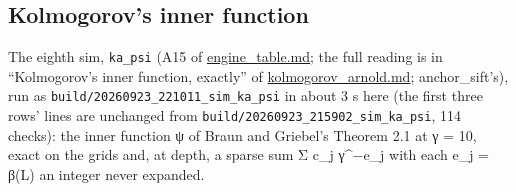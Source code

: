 \subsection{\texorpdfstring{Kolmogorov's inner function}{Kolmogorov's inner function}}

The eighth sim, \texttt{ka\_\allowbreak{}psi} (A15 of \hyperref[chap:engine-table]{engine\_\allowbreak{}table.md}; the full reading is in “Kolmogorov's inner function, exactly” of \hyperref[chap:kolmogorov-arnold]{kolmogorov\_\allowbreak{}arnold.md}; anchor\_\allowbreak{}sift's), run as \texttt{build/\allowbreak{}20260923\_\allowbreak{}221011\_\allowbreak{}sim\_\allowbreak{}ka\_\allowbreak{}psi} in about 3 s here (the first three rows' lines are unchanged from \texttt{build/\allowbreak{}20260923\_\allowbreak{}215902\_\allowbreak{}sim\_\allowbreak{}ka\_\allowbreak{}psi}, 114 checks): the inner function ψ of Braun and Griebel's Theorem 2.1 at γ = 10, exact on the grids and, at depth, a sparse sum Σ c\_\allowbreak{}j γ\textasciicircum{}−e\_\allowbreak{}j with each e\_\allowbreak{}j = β(L) an integer never expanded.

